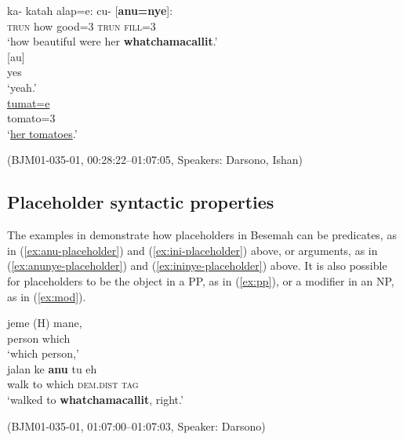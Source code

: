\documentclass[output=paper,
\ChapterDOI{10.5281/zenodo.15697583}
colorlinks,
citecolor=brown]{langscibook}
\begin{document}
\begin{exe}
    \ex\label{ex:disfluency-trunc} \begin{xlist}[0\quad →A:]
        \gll ka- katah alap=e: cu- [\textbf{anu=nye}]:\\
        \textsc{trun} how good=3 \textsc{trun} \textsc{fill}=3 \\
        \glt `how beautiful were her \textbf{whatchamacallit}.' \\
        \gll \hspace{11em}[au] \\
        \hspace{11em}yes \\
        \glt \hspace{11em}`yeah.' \\
         \uline{tumat=e} \\
        {} tomato=3 \\
        \glt `\uline{her tomatoes}.' \\
    \end{xlist}
    \hfill (BJM01-035-01, 00:28:22–01:07:05, Speakers: Darsono, Ishan) 
\end{exe}

\subsection{Placeholder syntactic properties}\label{sec:syntactic-position-placeholder}
The examples in  demonstrate how placeholders in Besemah can be predicates, as in (\ref{ex:anu-placeholder}) and (\ref{ex:ini-placeholder}) above, or arguments, as in (\ref{ex:anunye-placeholder}) and (\ref{ex:ininye-placeholder}) above. It is also possible for placeholders to be the object in a PP, as in (\ref{ex:pp}), or a modifier in an NP, as in (\ref{ex:mod}).


\begin{exe}
    \ex\label{ex:pp} \begin{xlist}[0\quad →A:]
        \gll jeme (H) mane,\\
        person {} which\\
        \glt `which person,' \\
        \gll jalan ke \textbf{anu} tu eh\\
        walk to which \textsc{dem.dist} \textsc{tag}\\
        \glt `walked to \textbf{whatchamacallit}, right.' \\
    \end{xlist}
    \hfill (BJM01-035-01, 01:07:00–01:07:03, Speaker: Darsono) 
\end{exe}
\end{document}
